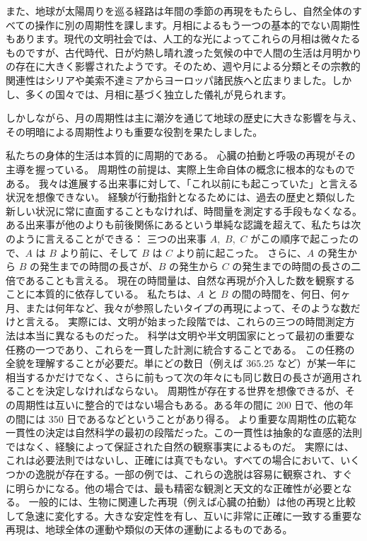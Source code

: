 \documentclass[a4paper,11pt,openany]{ltjsbook}
\begin{document}
また、地球が太陽周りを巡る経路は年間の季節の再現をもたらし、自然全体のすべての操作に別の周期性を課します。月相によるもう一つの基本的でない周期性もあります。現代の文明社会では、人工的な光によってこれらの月相は微々たるものですが、古代時代、日が灼熱し晴れ渡った気候の中で人間の生活は月明かりの存在に大きく影響されたようです。そのため、週や月による分類とその宗教的関連性はシリアや美索不達ミアからヨーロッパ諸民族へと広まりました。しかし、多くの国々では、月相に基づく独立した儀礼が見られます。

しかしながら、月の周期性は主に潮汐を通じて地球の歴史に大きな影響を与え、その明暗による周期性よりも重要な役割を果たしました。

私たちの身体的生活は本質的に周期的である。
心臓の拍動と呼吸の再現がその主導を握っている。
周期性の前提は、実際上生命自体の概念に根本的なものである。
我々は進展する出来事に対して、「これ以前にも起こっていた」と言える状況を想像できない。
経験が行動指針となるためには、過去の歴史と類似した新しい状況に常に直面することもなければ、時間量を測定する手段もなくなる。
ある出来事が他のよりも前後関係にあるという単純な認識を超えて、私たちは次のように言えることができる：
三つの出来事 $A$,~$B$,~$C$ がこの順序で起こったので、$A$ は $B$ より前に、そして $B$ は $C$ より前に起こった。
さらに、$A$ の発生から $B$ の発生までの時間の長さが、$B$ の発生から $C$ の発生までの時間の長さの二倍であることも言える。
現在の時間量は、自然な再現が介入した数を観察することに本質的に依存している。
私たちは、$A$ と $B$ の間の時間を、何日、何ヶ月、または何年など、我々が参照したいタイプの再現によって、そのような数だけと言える。
実際には、文明が始まった段階では、これらの三つの時間測定方法は本当に異なるものだった。
科学は文明や半文明国家にとって最初の重要な任務の一つであり、これらを一貫した計測に統合することである。
この任務の全貌を理解することが必要だ。単にどの数日（例えば $365.25$ など）が某一年に相当するかだけでなく、さらに前もって次の年々にも同じ数日の長さが適用されることを決定しなければならない。
周期性が存在する世界を想像できるが、その周期性は互いに整合的ではない場合もある。ある年の間に $200$ 日で、他の年の間には $350$ 日であるなどということがあり得る。
より重要な周期性の広範な一貫性の決定は自然科学の最初の段階だった。この一貫性は抽象的な直感的法則ではなく、経験によって保証された自然の観察事実によるものだ。
実際には、これは必要法則ではないし、正確には真でもない。すべての場合において、いくつかの逸脱が存在する。一部の例では、これらの逸脱は容易に観察され、すぐに明らかになる。他の場合では、最も精密な観測と天文的な正確性が必要となる。
一般的には、生物に関連した再現（例えば心臓の拍動）は他の再現と比較して急速に変化する。大きな安定性を有し、互いに非常に正確に一致する重要な再現は、地球全体の運動や類似の天体の運動によるものである。
\end{document}
